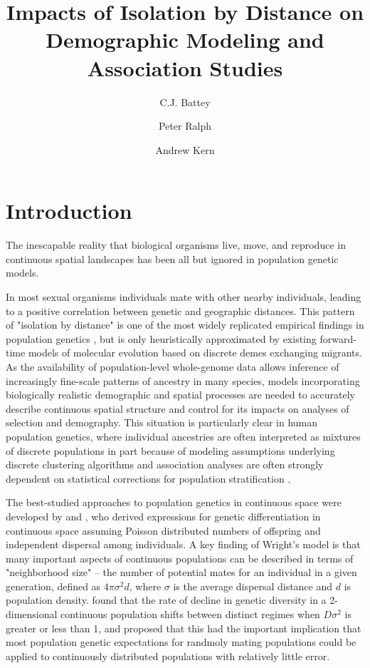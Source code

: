 \documentclass[9pt,twocolumn,twoside,lineno]{gsajnl}
\title{Impacts of Isolation by Distance on Demographic Modeling and Association Studies}
\author[$\ast$,1]{C.J. Battey}
\author[$\ast$]{Peter Ralph}
\author[$\ast$]{Andrew Kern}
\affil[$\ast$]{University of Oregon Dept. Biology, Institute for Ecology Evolution}
\begin{document}
\maketitle
\thispagestyle{firststyle}
\marginmark
\firstpagefootnote


\vspace{-35pt}%

\section{Introduction}
The inescapable reality that biological organisms live, move, and reproduce in continuous spatial landscapes has been all but ignored in population genetic models. 

In most sexual organisms individuals mate with other nearby individuals, leading to a positive correlation between genetic and geographic distances. This pattern of "isolation by distance" \citep{Wright1943} is one of the most widely replicated empirical findings in population genetics \citep{Chen2017,Jay2012,Sharbel2000}, but is only heuristically approximated by existing forward-time models of molecular evolution based on discrete demes exchanging migrants. As the availability of population-level whole-genome data allows inference of increasingly fine-scale patterns of ancestry in many species, models incorporating biologically realistic demographic and spatial processes are needed to accurately describe continuous spatial structure and control for its impacts on analyses of selection and demography. This situation is particularly clear in human population genetics, where individual ancestries are often interpreted as mixtures of discrete populations in part because of modeling assumptions underlying discrete clustering algorithms and association analyses are often strongly dependent on statistical corrections for population stratification \citep{Berg2018,Bulik-Sullivan2015,Young2018,Heckerman2016,Kang2010,Sohail2018}.  

The best-studied approaches to population genetics in continuous space were developed by \citep{Wright1943} and \citep{Malecot1948}, who derived expressions for genetic differentiation in continuous space assuming Poisson distributed numbers of offspring and independent dispersal among individuals. A key finding of Wright's model is that many important aspects of continuous populations can be described in terms of "neighborhood size" -- the number of potential mates for an individual in a given generation, defined as $4\pi\sigma^2d$, where $\sigma$ is the average dispersal distance and $d$ is population density. \cite{Maruyama1972} found that the rate of decline in genetic diversity in a 2-dimensional continuous population shifts between distinct regimes when $D\sigma^2$ is greater or less than 1, and proposed that this had the important implication that most population genetic expectations for randmoly mating populations could be applied to continuously distributed populations with relatively little error. 
\end{document}
